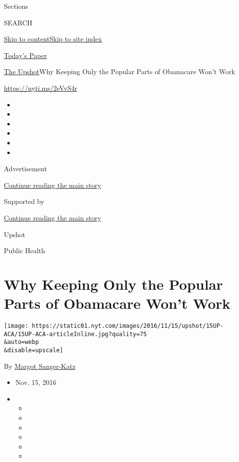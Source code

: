 Sections

SEARCH

\protect\hyperlink{site-content}{Skip to
content}\protect\hyperlink{site-index}{Skip to site index}

\href{https://myaccount.nytimes.com/auth/login?response_type=cookie\&client_id=vi}{}

\href{https://www.nytimes.com/section/todayspaper}{Today's Paper}

\href{/section/upshot}{The Upshot}\textbar{}Why Keeping Only the Popular
Parts of Obamacare Won't Work

\url{https://nyti.ms/2eVvS4r}

\begin{itemize}
\item
\item
\item
\item
\item
\item
\end{itemize}

Advertisement

\protect\hyperlink{after-top}{Continue reading the main story}

Supported by

\protect\hyperlink{after-sponsor}{Continue reading the main story}

Upshot

Public Health

\hypertarget{why-keeping-only-the-popular-parts-of-obamacare-wont-work}{%
\section{Why Keeping Only the Popular Parts of Obamacare Won't
Work}\label{why-keeping-only-the-popular-parts-of-obamacare-wont-work}}

\texttt{[image: https://static01.nyt.com/images/2016/11/15/upshot/15UP-ACA/15UP-ACA-articleInline.jpg?quality=75\\\&auto=webp\\\&disable=upscale]}

By \href{http://www.nytimes.com/by/margot-sanger-katz}{Margot
Sanger-Katz}

\begin{itemize}
\item
  Nov. 15, 2016
\item
  \begin{itemize}
  \item
  \item
  \item
  \item
  \item
  \item
  \end{itemize}
\end{itemize}

